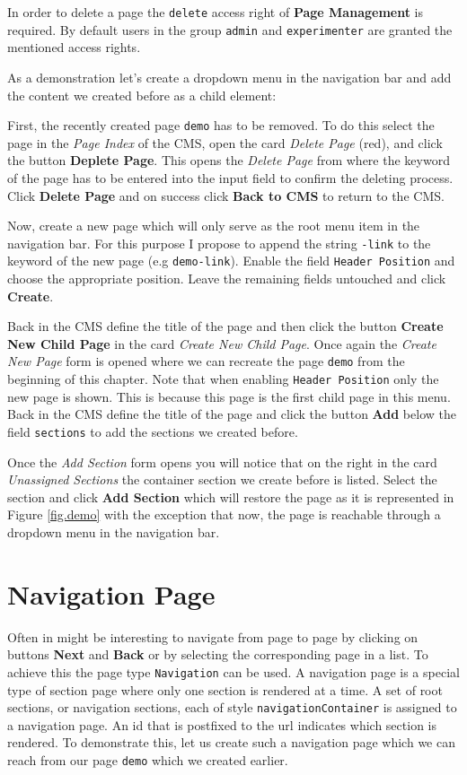 \documentclass[a4paper,oneside]{book}
\begin{document}
In order to delete a page the \texttt{delete} access right of \textbf{Page Management} is required.
By default users in the group \texttt{admin} and \texttt{experimenter} are granted the mentioned access rights.

As a demonstration let's create a dropdown menu in the navigation bar and add the content we created before as a child element:

First, the recently created page \texttt{demo} has to be removed.
To do this select the page in the \emph{Page Index} of the CMS, open the card \emph{Delete Page} (red), and click the button \textbf{Deplete Page}.
This opens the \emph{Delete Page} from where the keyword of the page has to be entered into the input field to confirm the deleting process.
Click \textbf{Delete Page} and on success click \textbf{Back to CMS} to return to the CMS.

Now, create a new page which will only serve as the root menu item in the navigation bar.
For this purpose I propose to append the string \texttt{-link} to the keyword of the new page (e.g \texttt{demo-link}).
Enable the field \texttt{Header Position} and choose the appropriate position.
Leave the remaining fields untouched and click \textbf{Create}.

Back in the CMS define the title of the page and then click the button \textbf{Create New Child Page} in the card \emph{Create New Child Page}.
Once again the \emph{Create New Page} form is opened where we can recreate the page \texttt{demo} from the beginning of this chapter.
Note that when enabling \texttt{Header Position} only the new page is shown.
This is because this page is the first child page in this menu.
Back in the CMS define the title of the page and click the button \textbf{Add} below the field \texttt{sections} to add the sections we created before.

Once the \emph{Add Section} form opens you will notice that on the right in the card \emph{Unassigned Sections} the container section we create before is listed.
Select the section and click \textbf{Add Section} which will restore the page as it is represented in Figure \ref{fig.demo} with the exception that now, the page is reachable through a dropdown menu in the navigation bar.

\section{Navigation Page}
Often in might be interesting to navigate from page to page by clicking on buttons \textbf{Next} and \textbf{Back} or by selecting the corresponding page in a list.
To achieve this the page type \texttt{Navigation} can be used.
A navigation page is a special type of section page where only one section is rendered at a time.
A set of root sections, or navigation sections, each of style \texttt{navigationContainer} is assigned to a navigation page.
An id that is postfixed to the url indicates which section is rendered.
To demonstrate this, let us create such a navigation page which we can reach from our page \texttt{demo} which we created earlier.
\end{document}
